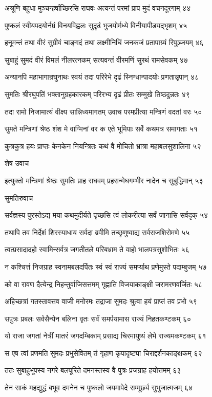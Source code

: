 अश्रूणि बहुधा मुञ्चन्हर्षाच्छिरसि राघवः
अत्यन्तं परमां प्राप मुदं वचनदूरगाम् ४४

पुष्कलं स्वीयपदयोर्नम्रं विनयविह्वलः
सुदृढं भुजयोर्मध्ये विनीयापीडयद्भृशम् ४५

हनूमन्तं तथा वीरं सुग्रीवं चाङ्गदं तथा
लक्ष्मीनिधिं जनकजं प्रतापाग्र्यं रिपुञ्जयम् ४६

सुबाहुं सुमदं वीरं विमलं नीलरत्नकम्
सत्यवन्तं वीरमणिं सुरथं रामसेवकम् ४७

अन्यानपि महाभागान्रघुनाथः स्वयं तदा
परिरेभे दृढं स्निग्धान्पादयोः प्रणतान्नृपान् ४८

सुमतिः श्रीरघुपतिं भक्तानुग्रहकारकम्
परिरभ्य दृढं प्रीतः सम्मुखे तिष्ठदुन्नतः ४९

तदा रामो निजामात्यं वीक्ष्य सान्निध्यमागतम्
उवाच परमप्रीत्या मन्त्रिणं वदतां वरः ५०

सुमते मन्त्रिणां श्रेष्ठ शंश मे वाग्मिनां वर
क एते भूमिपाः सर्वे कथमत्र समागताः ५१

कुत्रकुत्र हयः प्राप्तः केनकेन नियन्त्रितः
कथं वै मोचितो भ्रात्रा महाबलसुशालिना ५२

शेष उवाच

इत्युक्तो मन्त्रिणां श्रेष्ठः सुमतिः प्राह राघवम्
प्रहसन्मेघगम्भीर नादेन च सुबुद्धिमान् ५३

सुमतिरुवाच

सर्वज्ञस्य पुरस्तेऽद्य मया कथमुदीर्यते
पृच्छसि त्वं लोकरीत्या सर्वं जानासि सर्वदृक् ५४

तथापि तव निर्देशं शिरस्याधाय सर्वदा
ब्रवीमि तच्छृणुष्वाद्य सर्वराजशिरोमणे ५५

त्वत्प्रसादादहो स्वामिन्सर्वत्र जगतीतले
परिबभ्राम ते वाहो भालपत्रसुशोभितः ५६

न कश्चित्तं निजग्राह स्वनामबलदर्पितः
स्वं स्वं राज्यं समर्प्याथ प्रणेमुस्ते पदाम्बुजम् ५७

को वा रावण दैत्येन्द्र निहन्तुर्वाजिसत्तमम्
गृह्णाति विजयाकाङ्क्षी जरामरणवर्जितः ५८

अहिच्छत्रां गतस्तावत्तव वाजी मनोरमः
तद्राजा सुमदः श्रुत्वा हयं प्राप्तं तव प्रभो ५९

सपुत्रः प्रबलः सर्वसैन्येन बलिना वृतः
सर्वं समर्पयामास राज्यं निहतकण्टकम् ६०

यो राजा जगतां नेत्रीं मातरं जगदम्बिकाम्
प्रसाद्य चिरमायुष्यं लेभे राज्यमकण्टकम् ६१

स एष त्वां प्रणमति सुमदः प्रभुसेवितम्
तं गृहाण कृपादृष्ट्या चिराद्दर्शनकाङ्क्षकम् ६२

ततः सुबाहुभूपस्य नगरे बलपूरिते
दमनस्तस्य वै पुत्रः प्रजग्राह हयोत्तमम् ६३

तेन साकं महद्युद्धं बभूव दमनेन च
पुष्कलो जयमापेदे सम्मूर्छ्य सुभुजात्मजम् ६४

